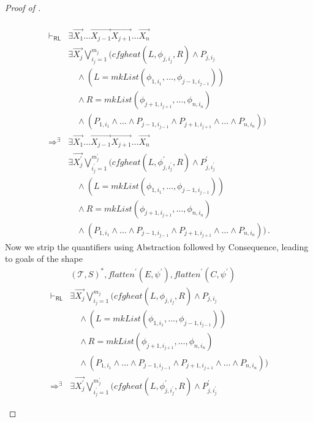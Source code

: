 \documentclass{article}
\newcommand{\RL}{\mathsf{RL}}
\begin{document}
\begin{proof}[Proof of ]
\begin{enumerate}
\begin{align*}
        \\ \vdash_\RL &
        \exists \vec{X_1} \ldots \vec{X_{j-1}} \vec{X_{j+1}} \ldots \vec{X_n}
        \\& \exists \vec{X_j} \bigvee_{i_j=1}^{m_j} (\mathit{cfgheat}(L, \phi_{j, i_j}, R) \land P_{j, i_j}
        \\&\quad \land (L = \mathit{mkList}(\phi_{1, i_1}, \ldots, \phi_{j-1, i_{j-1}}))
        \\&\quad \land R = \mathit{mkList}(\phi_{j+1, i_{j+1}}, \ldots, \phi_{n, i_{n}})
        \\&\quad \land (P_{1, i_1} \land \ldots \land P_{j-1, i_{j-1}} \land P_{j+1, i_{j+1}} \land \ldots \land P_{n, i_n}))
        \\ \Rightarrow^\exists &
        \exists \vec{X_1} \ldots \vec{X_{j-1}} \vec{X_{j+1}} \ldots \vec{X_n}
        \\& \exists \vec{X^\prime_j} \bigvee_{i^\prime_j=1}^{m^\prime_j} (\mathit{cfgheat}(L, \phi^\prime_{j, i^\prime_j}, R) \land P^\prime_{j, i^\prime_j}
        \\&\quad \land (L = \mathit{mkList}(\phi_{1, i_1}, \ldots, \phi_{j-1, i_{j-1}}))
        \\&\quad \land R = \mathit{mkList}(\phi_{j+1, i_{j+1}}, \ldots, \phi_{n, i_{n}})
        \\&\quad \land (P_{1, i_1} \land \ldots \land P_{j-1, i_{j-1}} \land P_{j+1, i_{j+1}} \land \ldots \land P_{n, i_n})) \, .
    \end{align*}
    Now we strip the quantifiers using Abstraction followed by Consequence,
    leading to goals of the shape
    \begin{align*}
        & (\mathcal{T}, S)^*, \mathit{flatten}^\prime(E, \psi^\prime), \mathit{flatten}^\prime(C, \psi^\prime)
        \\ \vdash_\RL &
        \exists \vec{X_j} \bigvee_{i_j=1}^{m_j} (\mathit{cfgheat}(L, \phi_{j, i_j}, R) \land P_{j, i_j}
        \\&\quad \land (L = \mathit{mkList}(\phi_{1, i_1}, \ldots, \phi_{j-1, i_{j-1}}))
        \\&\quad \land R = \mathit{mkList}(\phi_{j+1, i_{j+1}}, \ldots, \phi_{n, i_{n}})
        \\&\quad \land (P_{1, i_1} \land \ldots \land P_{j-1, i_{j-1}} \land P_{j+1, i_{j+1}} \land \ldots \land P_{n, i_n}))
        \\ \Rightarrow^\exists &
        \exists \vec{X^\prime_j} \bigvee_{i^\prime_j=1}^{m^\prime_j} (\mathit{cfgheat}(L, \phi^\prime_{j, i^\prime_j}, R) \land P^\prime_{j, i^\prime_j}

\end{align*}
\end{enumerate}
\end{proof}
\end{document}
